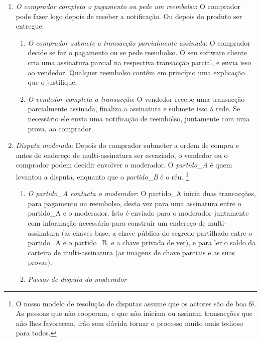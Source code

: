 \begin{enumerate}
\begin{enumerate}
    \end{enumerate}{}
    \item {\em O comprador completa o pagamento ou pede um reembolso}: O comprador pode fazer logo depois de receber a notificação. Ou depois do produto ser entregue.
    \begin{enumerate}
        \item {\em O comprador submete a transacção parcialmente assinada}: O comprador decide se faz o pagamento ou se pede reembolso. O seu software cliente cria uma assinatura parcial na respectiva transacção parcial, e envia isso ao vendedor. Qualquer reembolso contêm em princípio uma explicação que o justifique.
        \item {\em O vendedor completa a transacção}: O vendedor recebe uma transacção parcialmente assinada, finaliza a assinatura e submete isso á rede. Se necessário ele envia uma notificação de reembolso, juntamente com uma prova, ao comprador. 
    \end{enumerate}{}
    \item {\em Disputa moderada}: Depois do comprador submeter a ordem de compra e antes do endereço de multi-assinatura ser esvaziado, o vendedor ou o comprador podem decidir envolver o moderador. O {\em partido\_A} é quem levantou a disputa, enquanto que o {\em partido\_B} é o réu. 
\footnote{O nosso modelo de resolução de disputas assume que os actores são de boa fé. As pessoas que não cooperam, e que não iniciam ou assinam transacções que não lhes favorecem, irão sem dúvida tornar o processo muito mais tedioso para todos.} 
    \begin{enumerate}
        \item {\em O partido\_A contacta o moderador}: O partido\_A inicia duas transacções, para pagamento ou reembolso, desta vez para uma assinatura entre o partido\_A e o moderador. Isto é enviado para o moderador juntamente com informação necessária para construír um endereço de multi-assinatura (as chaves base, a chave pública do segredo partilhado entre o partido\_A e o partido\_B, e a chave privada de ver), e para ler o saldo da carteira de multi-assinatura (as imagens de chave parciais e as suas provas).     
        \item {\em Passos de disputa do moderador}
        \begin{enumerate}

\end{enumerate}
\end{enumerate}
\end{enumerate}
